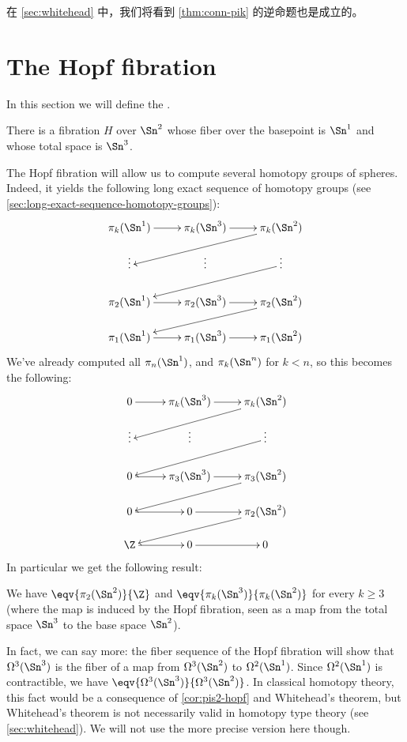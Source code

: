 {在 \cref{sec:whitehead} 中，我们将看到 \cref{thm:conn-pik} 的逆命题也是成立的。

%
%

\section{The Hopf fibration}
\label{sec:hopf}

In this section we will define the .
%

\begin{thm}\label{thm:hopf-fibration}
There is a fibration $H$ over $\Sn ^2$ whose fiber over the basepoint is $\Sn ^1$ and
whose total space is $\Sn ^3$.
\end{thm}

The Hopf fibration will allow us to compute several homotopy groups of
spheres.
Indeed, it yields the following long exact sequence
of homotopy groups
(see
\cref{sec:long-exact-sequence-homotopy-groups}):
%
\[
\xymatrix@R=1.2pc{
  \pi_k(\Sn^1) \ar[r] & \pi_k(\Sn^3) \ar[r] & \pi_k(\Sn^2) \ar[lld] \\
  \vdots & \vdots & \vdots \ar[lld] \\
  \pi_2(\Sn^1) \ar[r] & \pi_2(\Sn^3) \ar[r] & \pi_2(\Sn^2) \ar[lld] \\
  \pi_1(\Sn^1) \ar[r] & \pi_1(\Sn^3) \ar[r] & \pi_1(\Sn^2)}
\]
%
We've already computed all $\pi_n(\Sn^1)$, and $\pi_k(\Sn^n)$ for $k<n$, so this
becomes the following:
%
\[
\xymatrix@R=1.2pc{
  0 \ar[r] & \pi_k(\Sn^3) \ar[r] & \pi_k(\Sn^2) \ar[lld] \\
  \vdots & \vdots & \vdots \ar[lld] \\
  0 \ar[r] & \pi_3(\Sn^3) \ar[r] & \pi_3(\Sn^2) \ar[lld] \\
  0 \ar[r] & 0 \ar[r] & \pi_2(\Sn^2) \ar[lld] \\
  \Z \ar[r] & 0 \ar[r] & 0}
\]
%
In particular we get the following result:

\begin{cor} \label{cor:pis2-hopf}
  We have $\eqv{\pi_2(\Sn^2)}{\Z}$ and $\eqv{\pi_k(\Sn^3)}{\pi_k(\Sn^2)}$ for
  every $k\ge3$ (where the map is induced by the Hopf fibration, seen as a map
  from the total space $\Sn^3$ to the base space $\Sn^2$).
\end{cor}

In fact, we can say more: the fiber sequence of the Hopf fibration will show that $\Omega^3(\Sn^3)$ is the fiber of a map from $\Omega^3(\Sn^2)$ to $\Omega^2(\Sn^1)$.
Since $\Omega^2(\Sn^1)$ is contractible, we have $\eqv{\Omega^3(\Sn^3)}{\Omega^3(\Sn^2)}$.
In classical homotopy theory, this fact would be a consequence of \cref{cor:pis2-hopf} and Whitehead's theorem, but Whitehead's theorem is not necessarily valid in homotopy type theory (see \cref{sec:whitehead}).
We will not use the more precise version here though.

}
